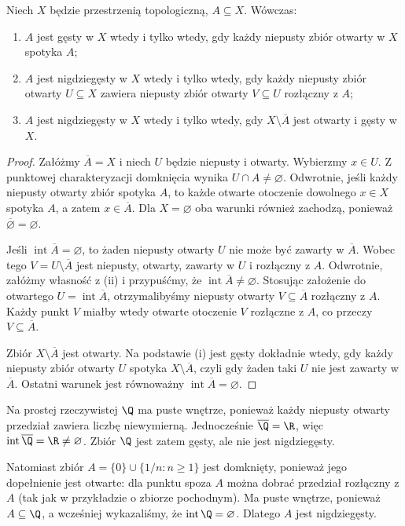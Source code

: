 \begin{twierdzenie}
\label{thm:topog-gesty-kryteria}
Niech $X$ będzie przestrzenią topologiczną, $A\subseteq X$.
Wówczas:
\begin{enumerate}[label=(\roman*)]
\item $A$ jest gęsty w $X$ wtedy i tylko wtedy, gdy
      każdy niepusty zbiór otwarty w $X$ spotyka $A$;
\item $A$ jest nigdziegęsty w $X$ wtedy i tylko wtedy, gdy
      każdy niepusty zbiór otwarty $U\subseteq X$ zawiera
      niepusty zbiór otwarty $V\subseteq U$ rozłączny z $A$;
\item $A$ jest nigdziegęsty w $X$ wtedy i tylko wtedy, gdy
      $X\setminus\overline A$ jest otwarty i gęsty w $X$.
\end{enumerate}
\end{twierdzenie}
\begin{proof}
Załóżmy $\overline A=X$ i niech $U$ będzie niepusty
i otwarty. Wybierzmy $x\in U$.
Z punktowej charakteryzacji domknięcia wynika $U\cap A\ne\varnothing$.
Odwrotnie, jeśli każdy niepusty otwarty zbiór spotyka $A$,
to każde otwarte otoczenie dowolnego $x\in X$ spotyka $A$,
a zatem $x\in\overline A$. Dla $X=\varnothing$
oba warunki również zachodzą, ponieważ $\overline\varnothing=\varnothing$.

Jeśli $\operatorname{int}\overline A=\varnothing$,
to żaden niepusty otwarty $U$ nie może być zawarty
w $\overline A$. Wobec tego
$V=U\setminus\overline A$ jest niepusty, otwarty,
zawarty w $U$ i rozłączny z $A$.
Odwrotnie, załóżmy własność z (ii) i przypuśćmy,
że $\operatorname{int}\overline A\ne\varnothing$.
Stosując założenie do otwartego
$U=\operatorname{int}\overline A$, otrzymalibyśmy
niepusty otwarty $V\subseteq\overline A$ rozłączny z $A$.
Każdy punkt $V$ miałby wtedy otwarte otoczenie $V$
rozłączne z $A$, co przeczy $V\subseteq\overline A$.

Zbiór $X\setminus\overline A$ jest otwarty.
Na podstawie (i) jest gęsty dokładnie wtedy, gdy
każdy niepusty zbiór otwarty $U$ spotyka
$X\setminus\overline A$, czyli gdy żaden taki $U$
nie jest zawarty w $\overline A$. Ostatni warunek
jest równoważny $\operatorname{int}\overline A=\varnothing$.
\end{proof}

\begin{przyklad}
\label{ex:topog-q-nigdziegesty}
Na prostej rzeczywistej $\Q$ ma puste wnętrze,
ponieważ każdy niepusty otwarty przedział zawiera
liczbę niewymierną. Jednocześnie $\overline\Q=\R$,
więc $\operatorname{int}\overline\Q=\R\ne\varnothing$.
Zbiór $\Q$ jest zatem gęsty, ale nie jest nigdziegęsty.

Natomiast zbiór $A=\{0\}\cup\{1/n:n\ge1\}$
jest domknięty, ponieważ jego dopełnienie jest otwarte:
dla punktu spoza $A$ można dobrać przedział rozłączny
z $A$ (tak jak w przykładzie o zbiorze pochodnym).
Ma puste wnętrze, ponieważ $A\subseteq\Q$,
a wcześniej wykazaliśmy, że
$\operatorname{int}\Q=\varnothing$.
Dlatego $A$ jest nigdziegęsty.
\end{przyklad}

